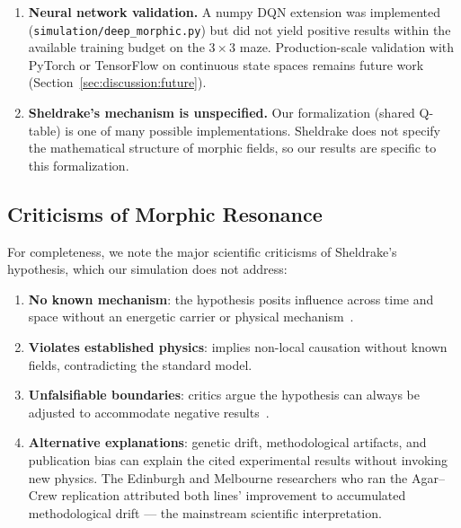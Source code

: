 \documentclass[twoside,11pt]{article}
\begin{document}
\begin{enumerate}[leftmargin=2em]
    \item \textbf{Neural network validation.}  A numpy DQN extension was
          implemented (\texttt{simulation/deep\_morphic.py}) but did not
          yield positive results within the available training budget on the
          $3\times3$ maze.  Production-scale validation with PyTorch or
          TensorFlow on continuous state spaces remains future work
          (Section~\ref{sec:discussion:future}).

    \item \textbf{Sheldrake's mechanism is unspecified.}  Our formalization
          (shared Q-table) is one of many possible implementations.
          Sheldrake does not specify the mathematical structure of morphic
          fields, so our results are specific to this formalization.
\end{enumerate}

\subsection{Criticisms of Morphic Resonance}
\label{sec:discussion:criticisms}

For completeness, we note the major scientific criticisms of Sheldrake's
hypothesis, which our simulation does not address:

\begin{enumerate}[leftmargin=2em]
    \item \textbf{No known mechanism}: the hypothesis posits influence across
          time and space without an energetic carrier or physical
          mechanism~\citep{rose2006}.
    \item \textbf{Violates established physics}: implies non-local causation
          without known fields, contradicting the standard model.
    \item \textbf{Unfalsifiable boundaries}: critics argue the hypothesis
          can always be adjusted to accommodate negative
          results~\citep{maddox1981}.
    \item \textbf{Alternative explanations}: genetic drift, methodological
          artifacts, and publication bias can explain the cited experimental
          results without invoking new physics.  The Edinburgh and Melbourne
          researchers who ran the Agar--Crew replication attributed both
          lines' improvement to accumulated methodological drift --- the
          mainstream scientific interpretation.
\end{enumerate}
\end{document}
